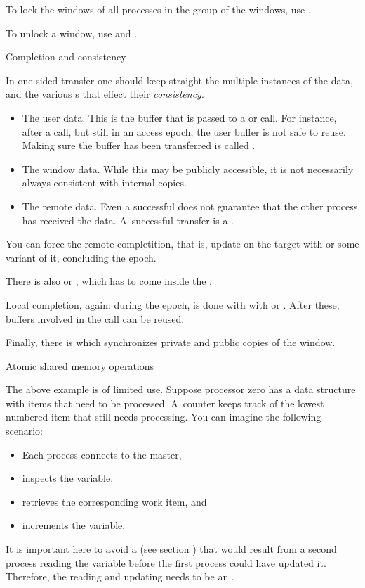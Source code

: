 To lock the windows of all processes in the group of the windows, use
.

To unlock a window, use
and
.


 {Completion and consistency}

In one-sided transfer one should keep straight the multiple instances
of the data, and the various s that effect
their \emph{consistency}.
\begin{itemize}
\item The user data. This is the buffer that is passed to a  or
   call. For instance, after a  call, but still in an
  access epoch, the user buffer is not safe to reuse. Making sure the
  buffer has been transferred is called .
\item The window data. While this may be publicly accessible, it is
  not necessarily always consistent with internal copies.
\item The remote data. Even a successful  does not guarantee
  that the other process has received the data. A~successful transfer
  is a .
\end{itemize}

You can force the remote completition, that is, update on the target
with
 or some variant of it, concluding the
epoch.

There is also
 or
, which has to come inside the
.

Local completion, again: during the epoch, is done with
with  or
.
After these, buffers involved in the call can be reused.


Finally, there is  which synchronizes
private and public copies of the window.

 {Atomic shared memory operations}

The above example is of limited use.
Suppose processor zero has a data structure 
with items that need to be processed. A~counter 
keeps track of the lowest numbered item that still needs processing.
You can imagine the following
 scenario:
\begin{itemize}
\item Each process connects to the master,
\item inspects the  variable,
\item retrieves the corresponding work item, and
\item increments the  variable.
\end{itemize}
It is important here to avoid a 
(see section ) that would result
from a second process reading the  variable 
before the first process could have updated it. Therefore, the reading
and updating needs to be an .

